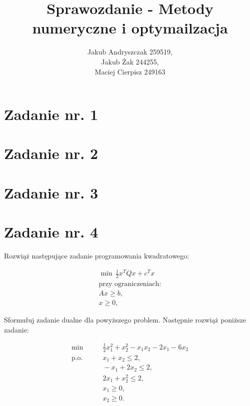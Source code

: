 \documentclass{article}
\begin{document}
\title{Sprawozdanie - Metody numeryczne i optymailzacja}
\author{Jakub Andryszczak 259519,\\ Jakub Żak 244255,\\ Maciej Cierpisz 249163}
\date{}
\maketitle

\newpage
\tableofcontents

\newpage
\section{Zadanie nr. 1}



\section{Zadanie nr. 2}

\section{Zadanie nr. 3}



\section{Zadanie nr. 4}

Rozwiąż następujące zadanie programowania kwadratowego:


\begin{align*}
\min \, \frac{1}{2}x^TQx + c^Tx \\
\text{przy ograniczeniach:} \\
Ax \ge b, \\
x \ge 0,
\end{align*}

Sformułuj zadanie dualne dla powyższego problem. Następnie rozwiąż poniższe zadanie:

\begin{align*}
    \min &\qquad \frac{1}{2}x_1^2 + x_2^2 - x_1x_2 - 2x_1 - 6x_2 \\
    \text{p.o.} &\qquad x_1 + x_2 \leq 2, \\
    &\qquad -x_1 + 2x_2 \leq 2, \\
    &\qquad 2x_1 + x_2^2 \leq 2, \\
    &\qquad x_1 \geq 0, \\
    &\qquad x_2 \geq 0.
    \end{align*}
    
\end{document}
